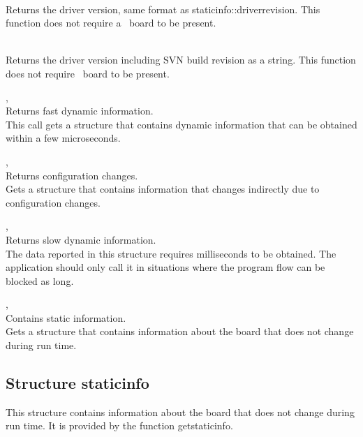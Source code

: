 			\\
			Returns the driver version, same format as \prefix static\tu info::driver\tu revision. This function does not require a \deviceName\ board to be present.

			\\
			Returns the driver version including SVN build revision as a string. This function does not require \deviceName\ board to be present.

			, \\
			Returns fast dynamic information.\\
			This call gets a structure that contains dynamic information that can be obtained within a few microseconds.\par

			, \\
			Returns configuration changes.\\
			Gets a structure that contains information that changes indirectly due to configuration changes.\par

			, \\
			Returns slow dynamic information.\\
			The data reported in this structure requires milliseconds to be obtained. 
			The application should only call it in situations where the program flow can be blocked as long.\par

			,\\
			Contains static information.\\
			Gets a structure that contains information about the board that does not change during run time.\par

		\subsection{Structure \prefix static\tu info}

			This structure contains information about the board that does not change during run time. It is provided by the function \textsf{\prefix get\tu static\tu info}.\par

